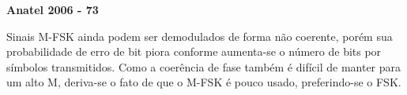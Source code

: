 \textbf{Anatel 2006 - 73}

Sinais M-FSK ainda podem ser demodulados de forma não coerente, porém sua probabilidade de erro de bit piora conforme aumenta-se o número de bits por símbolos transmitidos. Como a coerência de fase também é difícil de manter para um alto M, deriva-se o fato de que o M-FSK é pouco usado, preferindo-se o FSK. 